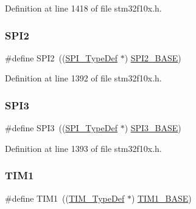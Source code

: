 Definition at line 1418 of file stm32f10x.\+h.

\mbox{\label{group___peripheral__declaration_gaf2c3d8ce359dcfbb2261e07ed42af72b}} 
\subsubsection{\texorpdfstring{S\+P\+I2}{SPI2}}
{\footnotesize\ttfamily \#define S\+P\+I2~((\hyperlink{struct_s_p_i___type_def}{S\+P\+I\+\_\+\+Type\+Def} $\ast$) \hyperlink{group___peripheral__memory__map_gac3e357b4c25106ed375fb1affab6bb86}{S\+P\+I2\+\_\+\+B\+A\+SE})}



Definition at line 1392 of file stm32f10x.\+h.

\mbox{\label{group___peripheral__declaration_gab2339cbf25502bf562b19208b1b257fc}} 
\subsubsection{\texorpdfstring{S\+P\+I3}{SPI3}}
{\footnotesize\ttfamily \#define S\+P\+I3~((\hyperlink{struct_s_p_i___type_def}{S\+P\+I\+\_\+\+Type\+Def} $\ast$) \hyperlink{group___peripheral__memory__map_gae634fe8faa6922690e90fbec2fc86162}{S\+P\+I3\+\_\+\+B\+A\+SE})}



Definition at line 1393 of file stm32f10x.\+h.

\mbox{\label{group___peripheral__declaration_ga2e87451fea8dc9380056d3cfc5ed81fb}} 
\subsubsection{\texorpdfstring{T\+I\+M1}{TIM1}}
{\footnotesize\ttfamily \#define T\+I\+M1~((\hyperlink{struct_t_i_m___type_def}{T\+I\+M\+\_\+\+Type\+Def} $\ast$) \hyperlink{group___peripheral__memory__map_gaf8aa324ca5011b8173ab16585ed7324a}{T\+I\+M1\+\_\+\+B\+A\+SE})}



